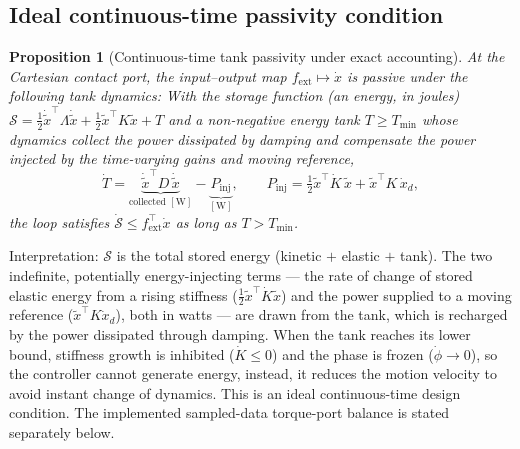 \documentclass[11pt,a4paper]{article}
\newtheorem{proposition}{Proposition}
\begin{document}
\subsection{Ideal continuous-time passivity condition}
\begin{proposition}[Continuous-time tank passivity under exact accounting]
\label{prop:pass}
At the Cartesian contact port, the input--output map
$f_{\text{ext}}\mapsto\dot x$ is passive under the following tank dynamics: With
the storage function (an energy, in joules)
$\mathcal S=\tfrac12\dot{\tilde x}^\top\Lambda\dot{\tilde x}+\tfrac12\tilde x^\top K\tilde x+T$
and a non-negative \emph{energy tank} $T\ge T_{\min}$ whose dynamics collect the
power dissipated by damping and compensate the power injected by the time-varying
gains and moving reference,
\begin{equation}
\dot T=\underbrace{\dot{\tilde x}^\top D\,\dot{\tilde x}}_{\text{collected }[\mathrm{W}]}
       -\underbrace{P_{\text{inj}}}_{[\mathrm{W}]},\qquad
P_{\text{inj}}=\tfrac12\tilde x^\top\dot K\,\tilde x+\tilde x^\top K\,\dot x_d ,
\end{equation}
the loop satisfies
$\dot{\mathcal S}\le f_{\text{ext}}^\top\dot x$ as long as $T>T_{\min}$.
\end{proposition}
\noindent Interpretation: $\mathcal S$ is the total stored energy (kinetic $+$ elastic $+$
tank). The two indefinite, potentially energy-injecting terms --- the rate of
change of stored elastic energy from a rising stiffness
($\tfrac12\tilde x^\top\dot K\tilde x$) and the power supplied to a moving
reference ($\tilde x^\top K\dot x_d$), both in watts --- are drawn from the tank,
which is recharged by the power dissipated through damping. When the tank
reaches its lower bound, stiffness growth is inhibited ($\dot K\!\le\!0$) and the
phase is frozen ($\dot\phi\!\to\!0$), so the controller cannot generate energy, instead,
it reduces the motion velocity to avoid instant change of dynamics.
This is an ideal continuous-time design condition. The implemented
sampled-data torque-port balance is stated separately below.
\end{document}
